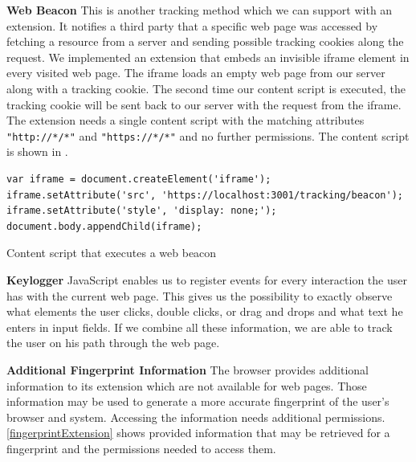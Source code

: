 			
			\textbf{Web Beacon} This is another tracking method which we can support with an extension. It notifies a third party that a specific web page was accessed by fetching a resource from a server and sending possible tracking cookies along the request. We implemented an extension that embeds an invisible iframe element in every visited web page. The iframe loads an empty web page from our server along with a tracking cookie. The second time our content script is executed, the tracking cookie will be sent back to our server with the request from the iframe. The extension needs a single content script with the matching attributes \texttt{"http://*/*"} and \texttt{"https://*/*"} and no further permissions. The content script is shown in .
			
			\begin{code}
				\begin{lstlisting}
var iframe = document.createElement('iframe');
iframe.setAttribute('src', 'https://localhost:3001/tracking/beacon');
iframe.setAttribute('style', 'display: none;');
document.body.appendChild(iframe);
				\end{lstlisting}
				\caption{Content script that executes a web beacon}
				\label{contentScriptWebBeacon}
			\end{code}
		
			\textbf{Keylogger} JavaScript enables us to register events for every interaction the user has with the current web page. This gives us the possibility to exactly observe what elements the user clicks, double clicks, or drag and drops and what text he enters in input fields. If we combine all these information, we are able to track the user on his path through the web page. 
		
			\textbf{Additional Fingerprint Information} The browser provides additional information to its extension which are not available for web pages. Those information may be used to generate a more accurate fingerprint of the user's browser and system. Accessing the information needs additional permissions. \ref{fingerprintExtension} shows provided information that may be retrieved for a fingerprint and the permissions needed to access them. \\
			
